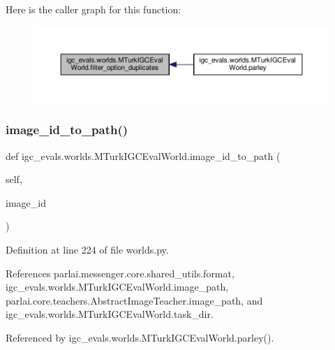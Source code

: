 Here is the caller graph for this function\+:
\nopagebreak
\begin{figure}[H]
\begin{center}
\leavevmode
\includegraphics[width=350pt]{classigc__evals_1_1worlds_1_1MTurkIGCEvalWorld_a93a8b179951ffcfac7c07da5da696e39_icgraph}
\end{center}
\end{figure}
\mbox{\label{classigc__evals_1_1worlds_1_1MTurkIGCEvalWorld_af15ae6901cfd80ff6b3253294f0f46c6}} 
\subsubsection{\texorpdfstring{image\+\_\+id\+\_\+to\+\_\+path()}{image\_id\_to\_path()}}
{\footnotesize\ttfamily def igc\+\_\+evals.\+worlds.\+M\+Turk\+I\+G\+C\+Eval\+World.\+image\+\_\+id\+\_\+to\+\_\+path (\begin{DoxyParamCaption}\item[{}]{self,  }\item[{}]{image\+\_\+id }\end{DoxyParamCaption})}



Definition at line 224 of file worlds.\+py.



References parlai.\+messenger.\+core.\+shared\+\_\+utils.\+format, igc\+\_\+evals.\+worlds.\+M\+Turk\+I\+G\+C\+Eval\+World.\+image\+\_\+path, parlai.\+core.\+teachers.\+Abstract\+Image\+Teacher.\+image\+\_\+path, and igc\+\_\+evals.\+worlds.\+M\+Turk\+I\+G\+C\+Eval\+World.\+task\+\_\+dir.



Referenced by igc\+\_\+evals.\+worlds.\+M\+Turk\+I\+G\+C\+Eval\+World.\+parley().

